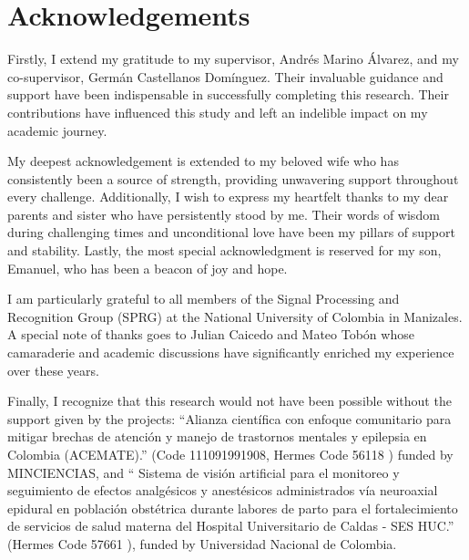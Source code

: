 \chapter*{\sffamily Acknowledgements}

Firstly, I extend my gratitude to my supervisor, Andrés Marino Álvarez, and my co-supervisor, Germán Castellanos Domínguez. Their invaluable guidance and support have been indispensable in successfully completing this research. Their contributions have influenced this study and left an indelible impact on my academic journey.

My deepest acknowledgement is extended to my beloved wife who has consistently been a source of strength, providing unwavering support throughout every challenge. Additionally, I wish to express my heartfelt thanks to my dear parents and sister who have persistently stood by me. Their words of wisdom during challenging times and unconditional love have been my pillars of support and stability. Lastly, the most special acknowledgment is reserved for my son, Emanuel, who has been a beacon of joy and hope.

I am particularly grateful to all members of the Signal Processing and Recognition Group (SPRG) at the National University of Colombia in Manizales. A special note of thanks goes to Julian Caicedo and Mateo Tobón whose camaraderie and academic discussions have significantly enriched my experience over these years.

Finally, I recognize that this research would not have been possible without the support given by the projects: “Alianza científica con enfoque comunitario para mitigar brechas de atención y manejo de trastornos mentales y epilepsia en Colombia (ACEMATE).” (Code 111091991908, Hermes Code 56118 ) funded by MINCIENCIAS, and “ Sistema de visión artificial para el monitoreo y seguimiento de efectos analgésicos y anestésicos administrados vía neuroaxial epidural en población obstétrica durante labores de parto para el fortalecimiento de servicios de salud materna del Hospital Universitario de Caldas - SES HUC.” (Hermes Code 57661 ), funded by Universidad Nacional de Colombia.